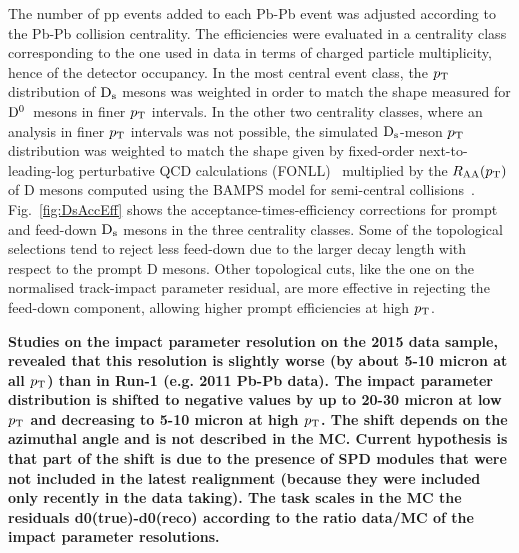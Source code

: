 The number of pp events added to each Pb-Pb 
event was adjusted according to the Pb-Pb collision centrality. 
The efficiencies were evaluated in a centrality class 
corresponding to the one used in 
data in terms of charged particle 
multiplicity, hence of the detector occupancy.
In the most central event class, the $p_{\rm T}$ distribution 
of ${\rm D_s}$ mesons was weighted in order to match the 
shape measured for \mbox{$\rm D^0$ mesons} in finer 
$p_{\rm T}$ intervals. In the other two centrality classes, 
where an analysis in finer $p_{\rm T}$ intervals was not possible, 
the simulated ${\rm D_s}$-meson $p_{\rm T}$ distribution was weighted 
to match the shape given by fixed-order next-to-leading-log 
perturbative QCD calculations (FONLL)~\cite{Cacciari:1998it,Cacciari:2001td} 
multiplied by the $R_{\rm AA}(p_{\rm T})$ of D mesons computed 
using the BAMPS model for semi-central 
collisions~\cite{Uphoff:2011ad,Fochler:2011en,Uphoff:2012gb}.
Fig.~\ref{fig:DsAccEff} shows the acceptance-times-efficiency 
corrections for prompt and feed-down ${\rm D_s}$ mesons in the three
centrality classes.
Some of the topological selections tend to reject 
less feed-down due to the larger 
decay length with respect to the prompt D mesons. 
Other topological cuts, like the one on the normalised 
track-impact parameter residual, are more effective
in rejecting the feed-down component, allowing higher 
prompt efficiencies at high $p_{\rm T}$.

{\bf Studies on the impact parameter resolution on the 
2015 data sample, revealed that this resolution is 
slightly worse (by about 5-10 micron at all $p_{\rm T}$) 
than in Run-1 (e.g. 2011 Pb-Pb data).
The impact parameter distribution is shifted to negative 
values by up to 20-30 micron at low $p_{\rm T}$ and 
decreasing to 5-10 micron at high $p_{\rm T}$. The shift 
depends on the azimuthal angle and is not described 
in the MC. Current hypothesis is that part of the shift 
is due to the presence of SPD modules that were not 
included in the latest realignment (because they were
 included only recently in the data taking). The task 
 scales in the MC the residuals d0(true)-d0(reco) 
 according to the ratio data/MC of the impact parameter resolutions.}\\
 


